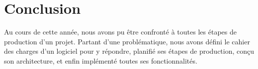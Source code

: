 \section{Conclusion}
Au cours de cette année, nous avons pu être confronté à toutes les étapes de production d'un projet. Partant d'une problématique, nous avons défini le cahier des charges d'un logiciel pour y répondre, planifié ses étapes de production, conçu son architecture, et enfin implémenté toutes ses fonctionnalités.